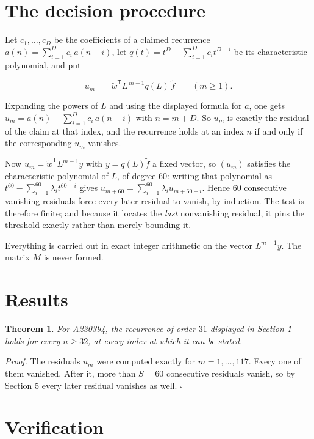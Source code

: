 \documentclass[11pt]{article}
\newtheorem{theorem}{Theorem}
\theoremstyle{definition}
\begin{document}
\section{The decision procedure}

Let $c_1,\dots,c_D$ be the coefficients of a claimed recurrence $a(n) = \sum_{i=1}^{D} c_i\,a(n-i)$, let $q(t) = t^{D} - \sum_{i=1}^{D} c_i t^{D-i}$ be its characteristic polynomial, and put

\[u_m \;=\; \tilde w^{\mathsf T} L^{\,m-1} q(L)\,\tilde f \qquad (m \ge 1).\]

Expanding the powers of $L$ and using the displayed formula for $a$, one gets $u_m = a(n) - \sum_{i=1}^{D} c_i\,a(n-i)$ with $n = m + D$. So $u_m$ is exactly the residual of the claim at that index, and the recurrence holds at an index $n$ if and only if the corresponding $u_m$ vanishes.

Now $u_m = \tilde w^{\mathsf T} L^{m-1} y$ with $y = q(L)\tilde f$ a fixed vector, so $(u_m)$ satisfies the characteristic polynomial of $L$, of degree $60$: writing that polynomial as $t^{60} - \sum_{i=1}^{60} \lambda_i t^{60-i}$ gives $u_{m+60} = \sum_{i=1}^{60} \lambda_i u_{m+60-i}$. Hence $60$ consecutive vanishing residuals force every later residual to vanish, by induction. The test is therefore finite; and because it locates the {\itshape last} nonvanishing residual, it pins the threshold exactly rather than merely bounding it.

Everything is carried out in exact integer arithmetic on the vector $L^{m-1}y$. The matrix $M$ is never formed.

\section{Results}

\begin{theorem} For A230394, the recurrence of order $31$ displayed in Section 1 holds for every $n \ge 32$, at every index at which it can be stated.\end{theorem}

{\itshape Proof.} The residuals $u_m$ were computed exactly for $m = 1,\dots,117$. Every one of them vanished. After it, more than $S = 60$ consecutive residuals vanish, so by Section 5 every later residual vanishes as well. $\square$

\section{Verification}
\end{document}
